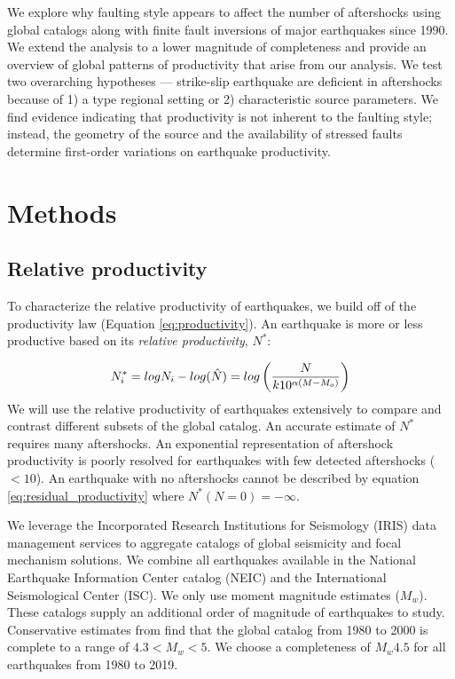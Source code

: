 \documentclass[12pt, notitlepage]{report}
\begin{document}
We explore why faulting style appears to affect the number of aftershocks using global catalogs along with finite fault inversions of major earthquakes since 1990. We extend the analysis to a lower magnitude of completeness and provide an overview of global patterns of productivity that arise from our analysis. We test two overarching hypotheses --- strike-slip earthquake are deficient in aftershocks because of 1) a type regional setting or 2) characteristic source parameters. We find evidence indicating that productivity is not inherent to the faulting style; instead, the geometry of the source and the availability of stressed faults determine first-order variations on earthquake productivity.


\section{Methods}
\subsection{Relative productivity}

To characterize the relative productivity of earthquakes, we build off of the productivity law (Equation \ref{eq:productivity}). An earthquake is more or less productive based on its \textit{relative productivity}, $N^*$:

\begin{equation}{\label{eq:residual_productivity}}
    N^*_i = logN_i - log(\hat{N}) = log\left(\dfrac{N}{k10^{\alpha(M-M_o)}}\right)
\end{equation}
We will use the relative productivity of earthquakes extensively to compare and contrast different subsets of the global catalog. 
An accurate estimate of $N^*$ requires many aftershocks. An exponential representation of aftershock productivity is poorly resolved for earthquakes with few detected aftershocks ($<10$). An earthquake with no aftershocks cannot be described by equation \ref{eq:residual_productivity} where $N^*(N=0) = -\infty$.

We leverage the Incorporated Research Institutions for Seismology (IRIS) data management services to aggregate catalogs of global seismicity and focal mechanism solutions. We combine all earthquakes available in the National Earthquake Information Center catalog (NEIC) and the International Seismological Center (ISC). We only use moment magnitude estimates ($M_w$). These catalogs supply an additional order of magnitude of earthquakes to study. Conservative estimates from \textcite{Woessner2005AssessingUncertainty}  find that the global catalog from 1980 to 2000 is complete to a range of $4.3 < M_w < 5$. We choose a completeness of $M_w4.5$ for all earthquakes from 1980 to 2019. 
\end{document}

